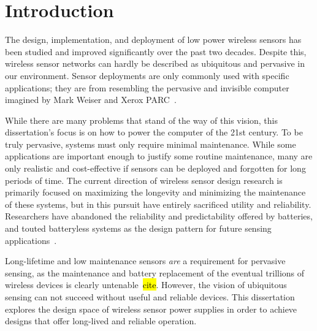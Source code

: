 \chapter{Introduction}
\label{chap:intro}

The design, implementation, and deployment of low power wireless sensors has been studied and improved significantly over the past two decades. Despite this, wireless sensor networks can hardly be described as ubiquitous and pervasive in our environment. Sensor deployments are only commonly used with specific applications; they are from resembling the pervasive and invisible computer imagined by Mark Weiser and Xerox PARC~\cite{weiser1991computer}.

While there are many problems that stand of the way of this vision, this dissertation's focus is on how to power the computer of the 21st century. 
To be truly pervasive, systems must only require minimal maintenance. While some applications are important enough to justify some routine maintenance, many are only realistic and cost-effective if sensors can be deployed and forgotten for long periods of time.
The current direction of wireless sensor design research is
primarily focused on maximizing the longevity and minimizing the maintenance of these systems, but in this pursuit have entirely sacrificed utility and reliability. Researchers have abandoned the reliability and predictability offered by batteries, and touted batteryless systems as the design pattern for future sensing applications~\cite{hester2017future}. 

Long-lifetime and low maintenance sensors \textit{are} a requirement for pervasive sensing, as the maintenance and battery replacement of the eventual trillions of wireless devices is clearly untenable~\hl{cite}. 
However, 
the vision of ubiquitous sensing can not succeed without useful and reliable devices. This dissertation explores the design space of wireless sensor power supplies in order to achieve designs that offer long-lived and reliable operation. 

